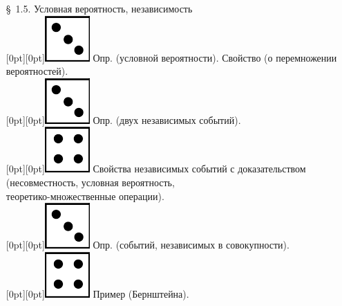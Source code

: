 \documentclass[10pt]{amsart}
\begin{document}
\begin{enumerate}
\begin{enumerate}
\item[\S\, 1.5.] Условная вероятность, независимость \\
 \raisebox{-1pt}[0pt][0pt]{\includegraphics[width=0.02\linewidth]{3.png}} Опр. (условной вероятности).  Свойство (о перемножении вероятностей). \\ 
 \raisebox{-1pt}[0pt][0pt]{\includegraphics[width=0.02\linewidth]{3.png}} Опр. (двух независимых событий). \\
 \raisebox{-1pt}[0pt][0pt]{\includegraphics[width=0.02\linewidth]{4.png}} Свойства независимых событий с доказательством (несовместность, условная вероятность, \\ теоретико-множественные операции). \\
 \raisebox{-1pt}[0pt][0pt]{\includegraphics[width=0.02\linewidth]{3.png}} Опр. (событий, независимых в совокупности). \\
 \raisebox{-1pt}[0pt][0pt]{\includegraphics[width=0.02\linewidth]{4.png}}  Пример (Бернштейна). \\



\end{enumerate}
\end{enumerate}
\end{document}
